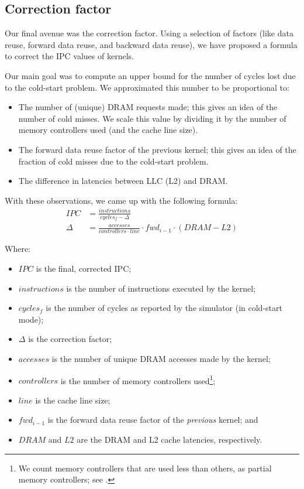 \subsection{Correction factor}\label{subsec:correction-factor}
Our final avenue was the correction factor.
Using a selection of factors (like data reuse, forward data reuse, and backward data reuse), we have proposed a formula to correct the IPC values of kernels.

Our main goal was to compute an upper bound for the number of cycles lost due to the cold-start problem.
We approximated this number to be proportional to:
\begin{itemize}
    \item The number of (unique) DRAM requests made; this gives an idea of the number of cold misses.
    We scale this value by dividing it by the number of memory controllers used (and the cache line size).
    \item The forward data reuse factor of the previous kernel; this gives an idea of the fraction of cold misses due to the cold-start problem.
    \item The difference in latencies between LLC (L2) and DRAM\@.
\end{itemize}

With these observations, we came up with the following formula:
\begin{align}
    IPC &= \frac{instructions}{cycles_f - \Delta} \\
    \Delta &= \frac{accesses}{controllers \cdot line} \cdot fwd_{i-1} \cdot (DRAM - L2)
\end{align}

Where:
\begin{itemize}
    \item $IPC$ is the final, corrected IPC;
    \item $instructions$ is the number of instructions executed by the kernel;
    \item $cycles_f$ is the number of cycles as reported by the simulator (in cold-start mode);
    \item $\Delta$ is the correction factor;
    \item $accesses$ is the number of unique DRAM accesses made by the kernel;
    \item $controllers$ is the number of memory controllers used\footnote{We count memory controllers that are used less than others, as partial memory controllers; see .};
    \item $line$ is the cache line size;
    \item $fwd_{i-1}$ is the forward data reuse factor of the \textit{previous} kernel; and
    \item $DRAM$ and $L2$ are the DRAM and L2 cache latencies, respectively.
\end{itemize}


